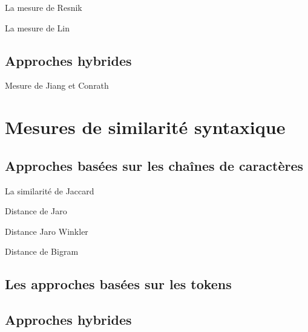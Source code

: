 \begin{appendices}
  La mesure de Resnik

  La mesure de Lin

  \subsection{Approches hybrides}
  \label{sec:semantic-sim:hybrides}  

  Mesure de Jiang et Conrath 


\section{Mesures de similarité syntaxique}
\label{sec:syntactic-sim}

  \subsection{Approches basées sur les chaînes de caractères}
  \label{sec:syntactic-sim:string}

  La similarité de Jaccard

  Distance de Jaro

  Distance Jaro Winkler

  Distance de Bigram

  \subsection{Les approches basées sur les tokens}
  \label{sec:syntactic-sim:tokens}  
 
  \subsection{Approches hybrides}
  \label{sec:syntactic-sim:hybrides}

\end{appendices}

